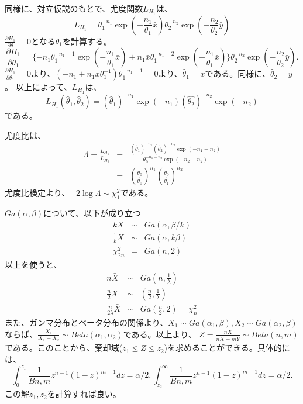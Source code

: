 同様に、対立仮説のもとで、尤度関数$L_{H_1}$は、
\begin{equation}
    L_{H_1} = \theta_1^{-n_1}\exp(-\frac{n_1}{\theta_1}\bar{x})\theta_2^{-n_2}\exp(-\frac{n_2}{\theta_2}\bar{y})
\end{equation}
$\frac{\partial H_1}{\partial\theta}=0$となる$\theta_1$を計算する。
\begin{equation}
    \frac{\partial H_1}{\partial\theta_1}=\{ -n_1\theta_1^{-n_1-1} \exp(-\frac{n_1}{\theta_1}\bar{x})+n_1\bar{x}\theta_1^{-n_1-2}\exp(-\frac{n_1}{\theta_1}\bar{x})\}\theta_2^{-n_2}\exp(-\frac{n_2}{\theta_2}\bar{y}).
\end{equation}
$ \frac{\partial H_1}{\partial\theta_1}=0$より、$(-n_1+n_1\bar{x}\theta_1^{-1})\theta_1^{-n_1-1}=0$より、$\hat{\theta}_1=\bar{x}$である。同様に、$\hat{\theta}_2=\bar{y}$。
以上によって、$L_{H_1}$は、
\begin{equation}
    L_{H_1}(\hat{\theta}_1,\hat{\theta}_2) = (\hat{\theta}_1)^{-n_1}\exp(-n_1)(\hat{\theta_2})^{-n_2}\exp(-n_2)
\end{equation}
である。

尤度比は、
\begin{eqnarray}
    \varLambda = \frac{L_{H_1}}{L_{H_0}} &=& \frac{ (\hat{\theta}_1)^{-n_1}(\hat{\theta}_2)^{-n_2} \exp(-n_1-n_2)}{ \theta_0^{-n_1-n_2}\exp(-n_2-n_2) }\\
    &=& \left(\frac{\theta_0}{\hat{\theta_0}}\right)^{n_1} \left(\frac{\theta_0}{\hat{\theta_1}} \right)^{n_2}
\end{eqnarray}
尤度比検定より、$-2\log \varLambda \sim\chi^2_1$である。

$Ga(\alpha,\beta)$について、以下が成り立つ
\begin{eqnarray}
    k X &\sim& Ga(\alpha,\beta/k) \\
    \frac{1}{k} X &\sim& Ga(\alpha,k\beta)\\
    \chi^2_{2n}&=&Ga(n,2) 
\end{eqnarray}
以上を使うと、
\begin{eqnarray*}
    n\bar{X} &\sim& Ga(n,\frac{1}{\lambda}) \\
    \frac{n}{2}\bar{X} &\sim&(\frac{n}{2},\frac{1}{\lambda}) \\
    \frac{n}{2\lambda}\bar{X} &\sim& Ga(\frac{n}{2},2)=\chi^2_{n}
\end{eqnarray*}
また、ガンマ分布とベータ分布の関係より、$X_1 \sim Ga(\alpha_1,\beta),X_2\sim Ga(\alpha_2,\beta)$ならば、$\frac{X_1}{X_1+X_2}\sim Beta(\alpha_1,\alpha_2)$である。以上より、
$Z=\frac{n\bar{X}}{n\bar{X}+m\bar{Y}}\sim Beta(n,m)$である。このことから、棄却域($z_1 \leq Z \leq z_2$)を求めることができる。具体的には、
\begin{equation}
    \int_0^{z_1}\frac{1}{B{n,m}}z^{n-1}(1-z)^{m-1}dz = \alpha/2,      \int_{z_2}^{\infty}\frac{1}{B{n,m}}z^{n-1}(1-z)^{m-1}dz = \alpha/2.
\end{equation}
この解$z_1,z_2$を計算すれば良い。






